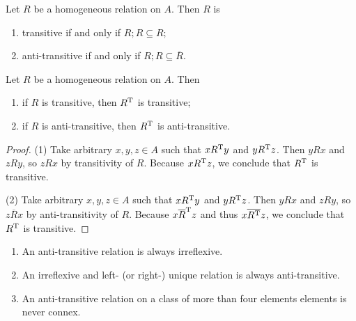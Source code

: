 \begin{lemma}
Let $R$ be a homogeneous relation on $A$. Then $R$ is
\begin{enumerate}
\item transitive \textup{if and only if} $R; R \subseteq R$;
\item anti-transitive \textup{if and only if} $R; R \subseteq \overline{R}$.
\end{enumerate}
\end{lemma}

\begin{lemma} \label{transposeTransitive}
Let $R$ be a homogeneous relation on $A$. Then
\begin{enumerate}
\item if $R$ is transitive, then $R^{\mathrm{T}}$ is transitive;
\item if $R$ is anti-transitive, then $R^{\mathrm{T}}$ is anti-transitive.
\end{enumerate}
\end{lemma}
\begin{proof}
(1) Take arbitrary $x,y,z\in A$ such that $xR^{\mathrm{T}} y$ and $yR^{\mathrm{T}} z$. Then $yRx$ and $zRy$, so $zRx$ by transitivity of $R$. Because $xR^{\mathrm{T}} z$, we conclude that $R^{\mathrm{T}}$ is transitive.

(2) Take arbitrary $x,y,z\in A$ such that $xR^{\mathrm{T}} y$ and $yR^{\mathrm{T}} z$. Then $yRx$ and $zRy$, so $z\overline{R}x$ by anti-transitivity of $R$. Because $x\overline{R}^{\mathrm{T}} z$ and thus $x\overline{R^{\mathrm{T}}} z$, we conclude that $R^{\mathrm{T}}$ is transitive.
\end{proof}


\begin{lemma}
\begin{enumerate}
\item An anti-transitive relation is always irreflexive.
\item An irreflexive and left- (or right-) unique relation is always anti-transitive.
\item An anti-transitive relation on a class of more than four elements elements is never connex.
\end{enumerate}
\end{lemma}

